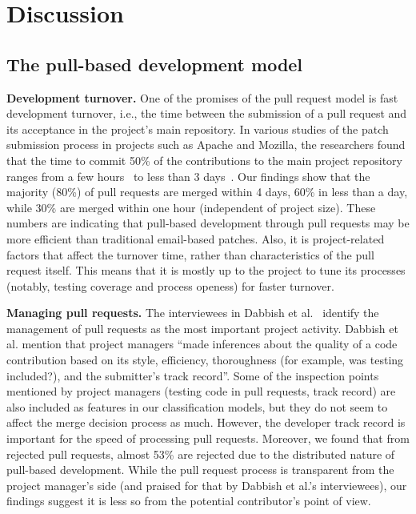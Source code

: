 \documentclass{sig-alternate}
\begin{document}
\section{Discussion}
\label{sec:discussion}

\subsection{The pull-based development model}

\textbf{Development turnover.} One of the promises of the pull request model is
fast development turnover, i.e., the time between the submission of a pull
request and its acceptance in the project's main repository. In various studies
of the patch submission process in projects such as Apache and Mozilla, the
researchers found that the time to commit 50\% of the contributions to the main
project repository ranges from a few hours~\cite{Rigby08} to less than 3
days~\cite{Weiss08, Baysa12}. Our findings show that the majority (80\%) of pull
requests are merged within 4 days, 60\% in less than a day, while 30\% are
merged within one hour (independent of project size). These numbers are
indicating that pull-based development through pull requests may be more
efficient than traditional email-based patches.  Also, it is project-related
factors that affect the turnover time, rather than characteristics of the pull
request itself. This means that it is mostly up to the project to tune its processes
(notably, testing coverage and process openess) for faster turnover.

\textbf{Managing pull requests.} The interviewees in Dabbish et
al.~\cite{Dabbi13} identify the management of pull requests as the most
important project activity. Dabbish et al. mention that project managers ``made
inferences about the quality of a code contribution based on its style,
efficiency, thoroughness (for example, was testing included?), and the
submitter's track record''. Some of the inspection points mentioned by project
managers (testing code in
pull requests, track record) are also included as features in our classification
models, but they do not seem to affect the merge decision process as much.
However, the developer track record is important for the speed of processing
pull requests. Moreover, we found that from rejected pull requests, almost 53\%
are rejected due to the distributed nature of pull-based development. While the pull request process is
transparent from the project manager's side (and praised for that by Dabbish et
al.'s interviewees), our findings suggest it is less so from the potential contributor's point of view.
\end{document}
